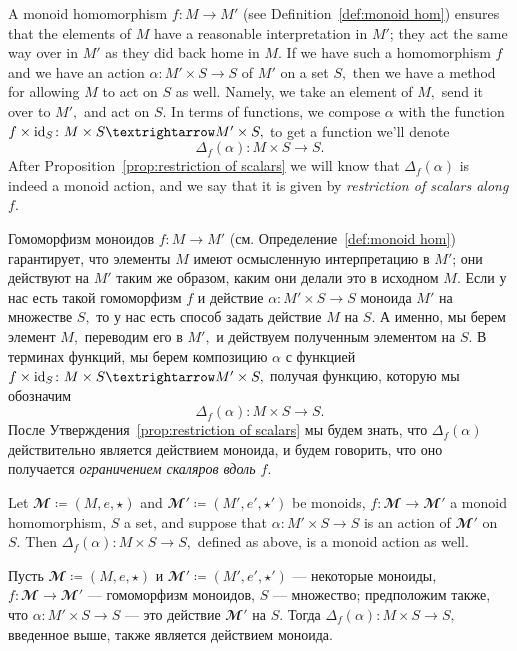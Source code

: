 \documentclass[../main/CT4S-EN-RU]{subfiles}
\begin{document}
\begin{blockENG}
A monoid homomorphism $f\colon M{→} M'$ (see Definition~\ref{def:monoid hom}) ensures that the elements of $M$ have a reasonable interpretation in $M'$; they act the same way over in $M'$ as they did back home in $M.$ If we have such a homomorphism $f$ and we have an action $\alpha\colon M'\times S{→} S$ of $M'$ on a set $S,$ then we have a method for allowing $M$ to act on $S$ as well. Namely, we take an element of $M,$ send it over to $M',$ and act on $S.$ In terms of functions, we compose $\alpha$ with the function $f\times\id_S\colon M\times S{→} M'\times S,$ to get a function we'll denote $${Δ}_f(\alpha)\colon M\times S{→} S.$$ After Proposition~\ref{prop:restriction of scalars} we will know that ${Δ}_f(\alpha)$ is indeed a monoid action, and we say that it is given by {\em restriction of scalars along $f$}.
\end{blockENG}

\begin{blockRUS}
Гомоморфизм моноидов $f\colon M{→} M'$ (см. Определение~\ref{def:monoid hom}) гарантирует, что элементы $M$ имеют осмысленную интерпретацию в $M'$; они действуют на $M'$ таким же образом, каким они делали это в исходном $M.$ Если у нас есть такой гомоморфизм $f$ и действие $\alpha\colon M'\times S{→} S$ моноида $M'$ на множестве $S,$ то у нас есть способ задать действие $M$ на $S$. А именно, мы берем элемент $M,$ переводим его в $M',$ и действуем полученным элементом на $S.$ В терминах функций, мы берем композицию $\alpha$ с функцией $f\times\id_S\colon M\times S{→} M'\times S,$ получая функцию, которую мы обозначим $${Δ}_f(\alpha)\colon M\times S{→} S.$$ После Утверждения~\ref{prop:restriction of scalars} мы будем знать, что ${Δ}_f(\alpha)$ действительно является действием моноида, и будем говорить, что оно получается {\em ограничением скаляров вдоль $f$}.
\end{blockRUS}

\begin{propositionENG}\label{prop:restriction of scalars}
Let ${𝓜}{\coloneqq}(M,e,{⋆})$ and ${𝓜}'{\coloneqq}(M',e',{⋆}')$ be monoids, $f\colon{𝓜}{→}{𝓜}'$ a monoid homomorphism, $S$ a set, and suppose that $\alpha\colon M'\times S{→} S$ is an action of ${𝓜}'$ on $S.$ Then ${Δ}_f(\alpha)\colon M\times S{→} S,$ defined as above, is a monoid action as well.
\end{propositionENG}

\begin{propositionRUS}\label{prop:restriction of scalars}
Пусть ${𝓜}{\coloneqq}(M,e,{⋆})$ и ${𝓜}'{\coloneqq}(M',e',{⋆}')$ — некоторые моноиды, $f\colon{𝓜}{→}{𝓜}'$ — гомоморфизм моноидов, $S$ — множество; предположим также, что $\alpha\colon M'\times S{→} S$ — это действие ${𝓜}'$ на $S.$ Тогда ${Δ}_f(\alpha)\colon M\times S{→} S,$ введенное выше, также является действием моноида.
\end{propositionRUS}
\end{document}
